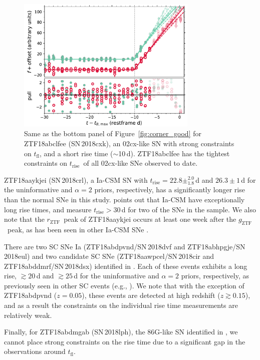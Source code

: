 \documentclass[twocolumn]{aastex63}
\newcommand{\rztf}{$r_\mathrm{ZTF}$}
\newcommand{\gztf}{$g_\mathrm{ZTF}$}
\newcommand{\tfl}{$t_\mathrm{fl}$}
\newcommand{\trise}{$t_\mathrm{rise}$}
\begin{document}
\begin{figure}
    \centering
    \includegraphics[width=3.4in]{./figures/ZTF18abclfee_model_lc.pdf}
    \caption{Same as the bottom panel of Figure~\ref{fig:corner_good} for
    ZTF18abclfee (SN\,2018cxk), an 02cx-like SN with strong constraints on
    \tfl, and a short rise time ($\sim$10\,d). ZTF18abclfee has the tightest
    constraints on \trise\ of all 02cx-like SNe observed to date.}
    \label{fig:02cx}
\end{figure}

ZTF18aaykjei (SN\,2018crl), a Ia-CSM SN with \trise$ = 22.8
\pm^{2.0}_{1.8}$\,d and $26.3 \pm 1$\,d for the uninformative and $\alpha = 2$
priors, respectively, has a significantly longer rise than the normal SNe in
this study. \citet{Silverman13} points out that Ia-CSM have exceptionally long
rise times, and \citet{Firth15} measure \trise$ > 30$\,d for two of the SNe in
the \citet{Silverman13} sample. We also note that the \rztf\ peak of
ZTF18aaykjei occurs at least one week after the \gztf\ peak, as has been seen
in other Ia-CSM SNe \citep{aldering05gj,prieto05gj}.

There are two SC SNe Ia (ZTF18abdpvnd/SN\,2018dvf and
ZTF18abhpgje/SN\,2018eul) and two candidate SC SNe (ZTF18aawpcel/SN\,2018cir
and ZTF18abddmrf/SN\,2018dsx) identified in \citet{Yao19}. Each of these
events exhibits a long rise, $\gtrsim 20$\,d and $\gtrsim 25$\,d for the
uninformative and $\alpha=2$ priors, respectively, as previously seen in other
SC events (e.g., \citealt{Scalzo10,Silverman11}). We note that with the
exception of ZTF18abdpvnd ($z = 0.05$), these events are detected at high
redshift ($z \gtrsim 0.15$), and as a result the constraints on the individual
rise time measurements are relatively weak.

Finally, for ZTF18abdmgab (SN\,2018lph), the 86G-like SN identified in
\citet{Yao19}, we cannot place strong constraints on the rise time due to a
significant gap in the observations around \tfl.
\end{document}
